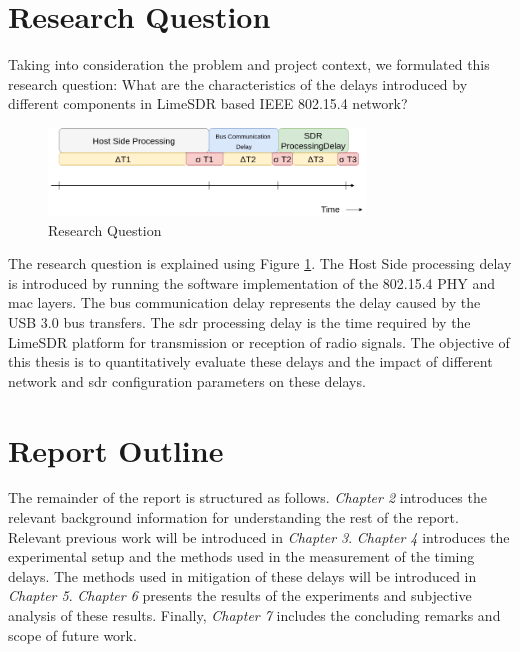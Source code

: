 







\section{Research Question}
Taking into consideration the problem and project context, we formulated this research question:
What are the characteristics of the delays introduced by different components in LimeSDR based IEEE 802.15.4 network?
\begin{figure}[!h]
\centering
\includegraphics[width=0.75\textwidth]{Figure/RQ1.png}
\caption{Research Question}
\label{rq1}
\end{figure}

The research question is explained using Figure \ref{rq1}.
The Host Side processing delay is introduced by running the software implementation of the 802.15.4 \ac{PHY} and \ac{mac} layers.
The bus communication delay represents the delay caused by the \ac{USB} 3.0 bus transfers.
The \ac{sdr} processing delay is the time required by the LimeSDR platform for transmission or reception of radio signals.
The objective of this thesis is to quantitatively evaluate these delays and the impact of different network and \ac{sdr} configuration parameters on these delays.

\section{Report Outline}
The remainder of the report is structured as follows. \textit{Chapter 2} introduces the relevant background information for understanding the rest of the report.
Relevant previous work will be introduced in \textit{Chapter 3}.
\textit{Chapter 4} introduces the experimental setup and the methods used in the measurement of the timing delays.
The methods used in mitigation of these delays will be introduced in \textit{Chapter 5}.
\textit{Chapter 6} presents the results of the experiments and subjective analysis of these results.
Finally, \textit{Chapter 7} includes the concluding remarks and scope of future work.
